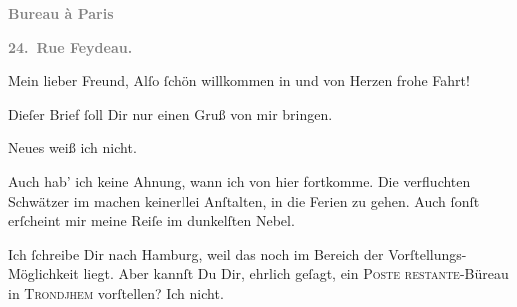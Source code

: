 \pstart
           \begin{otherlanguage}{french}\textcolor{gray}{\textbf{\textbf{Bureau à Paris}}}\end{otherlanguage}\pend
           
\pstart
           \begin{otherlanguage}{french}\textcolor{gray}{\textbf{\textbf{24. Rue Feydeau.}}}\end{otherlanguage}\pend
           
\pstart\center{}Mein lieber Freund,\pend\vspace{0.5em}
\pstart
           Alſo ſchön willkommen in \label{K_L02780-1v}\label{K_L02780-1} und von Herzen frohe
               Fahrt!\pend
           
\pstart
           Dieſer Brief ſoll Dir nur einen Gruß von mir \strikeout{\textcolor{gray}{×}\-\textcolor{gray}{×}\-\textcolor{gray}{×}} bringen.\pend
           
\pstart
           Neues weiß ich nicht.\pend
           
\pstart
           Auch hab’ ich keine Ahnung, wann ich von hier fortkomme. Die verfluchten Schwätzer im
                  {\pb}\label{K_L02780-2v}\label{K_L02780-2} machen keiner\textcolor{gray}{l}lei Anſtalten, in die Ferien zu gehen. Auch
               ſonſt erſcheint mir meine Reiſe im dunkelſten Nebel.\pend
           
\pstart
           Ich ſchreibe Dir  nach Hamburg,
               weil das noch im Bereich der Vorſtellungs-Möglichkeit liegt. Aber kannſt Du Dir,
               ehrlich geſagt, ein \textsc{Poste restante}-Büreau in \textsc{Trondjhem} vorſtellen? Ich nicht.\pend
           
